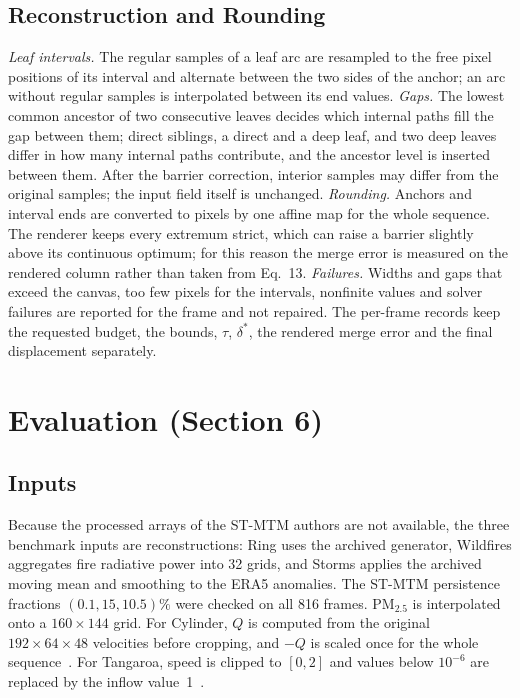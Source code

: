 \documentclass[preprint]{vgtc}
\begin{document}
\subsection{Reconstruction and Rounding}
\emph{Leaf intervals.} The regular samples of a leaf arc are resampled to the free pixel positions of its interval and alternate between the two sides of the anchor; an arc without regular samples is interpolated between its end values.
\emph{Gaps.} The lowest common ancestor of two consecutive leaves decides which internal paths fill the gap between them; direct siblings, a direct and a deep leaf, and two deep leaves differ in how many internal paths contribute, and the ancestor level is inserted between them. After the barrier correction, interior samples may differ from the original samples; the input field itself is unchanged.
\emph{Rounding.} Anchors and interval ends are converted to pixels by one affine map for the whole sequence. The renderer keeps every extremum strict, which can raise a barrier slightly above its continuous optimum; for this reason the merge error is measured on the rendered column rather than taken from Eq.~13.
\emph{Failures.} Widths and gaps that exceed the canvas, too few pixels for the intervals, nonfinite values and solver failures are reported for the frame and not repaired. The per-frame records keep the requested budget, the bounds, $\tau$, $\delta^*$, the rendered merge error and the final displacement separately.

\section{Evaluation (Section 6)}\label{sec:evaluation}
\subsection{Inputs}
Because the processed arrays of the ST-MTM authors are not available, the three benchmark inputs are reconstructions: Ring uses the archived generator, Wildfires aggregates fire radiative power into 32 grids, and Storms applies the archived moving mean and smoothing to the ERA5 anomalies. The ST-MTM persistence fractions $(0.1,15,10.5)\%$ were checked on all 816 frames. PM$_{2.5}$ is interpolated onto a $160\times144$ grid. For Cylinder, $Q$ is computed from the original $192\times64\times48$ velocities before cropping, and $-Q$ is scaled once for the whole sequence~\cite{Camarri:2005:Cylinder,Weinkauf:SquareCylinder}. For Tangaroa, speed is clipped to $[0,2]$ and values below $10^{-6}$ are replaced by the inflow value~1~\cite{Popinet:2004:Tangaroa}.
\end{document}
